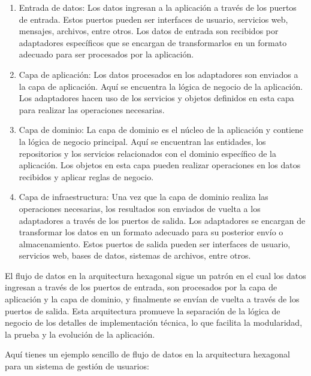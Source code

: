 \documentclass[executivepaper]{article}
\begin{document}
\begin{enumerate}
    \item Entrada de datos: Los datos ingresan a la aplicación a través de los puertos de entrada. Estos puertos pueden ser interfaces de usuario, servicios web, mensajes, archivos, entre otros. Los datos de entrada son recibidos por adaptadores específicos que se encargan de transformarlos en un formato adecuado para ser procesados por la aplicación.
    \item Capa de aplicación: Los datos procesados en los adaptadores son enviados a la capa de aplicación. Aquí se encuentra la lógica de negocio de la aplicación. Los adaptadores hacen uso de los servicios y objetos definidos en esta capa para realizar las operaciones necesarias.
    \item Capa de dominio: La capa de dominio es el núcleo de la aplicación y contiene la lógica de negocio principal. Aquí se encuentran las entidades, los repositorios y los servicios relacionados con el dominio específico de la aplicación. Los objetos en esta capa pueden realizar operaciones en los datos recibidos y aplicar reglas de negocio.
    \item Capa de infraestructura: Una vez que la capa de dominio realiza las operaciones necesarias, los resultados son enviados de vuelta a los adaptadores a través de los puertos de salida. Los adaptadores se encargan de transformar los datos en un formato adecuado para su posterior envío o almacenamiento. Estos puertos de salida pueden ser interfaces de usuario, servicios web, bases de datos, sistemas de archivos, entre otros.
\end{enumerate}

El flujo de datos en la arquitectura hexagonal sigue un patrón en el cual los datos ingresan a través de los puertos de entrada, son procesados por la capa de aplicación y la capa de dominio, y finalmente se envían de vuelta a través de los puertos de salida. Esta arquitectura promueve la separación de la lógica de negocio de los detalles de implementación técnica, lo que facilita la modularidad, la prueba y la evolución de la aplicación.

Aquí  tienes un ejemplo sencillo de flujo de datos en la arquitectura hexagonal para un sistema de gestión de usuarios:
\end{document}
